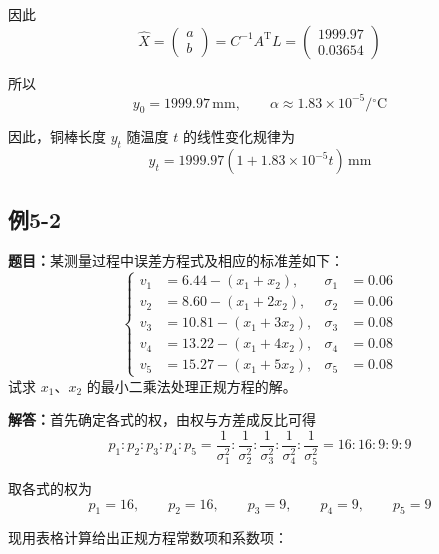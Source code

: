 \documentclass[UTF8,zihao=-4]{ctexart}
\newcommand{\problem}[1]{\subsection*{#1}}
\newcommand{\timu}{\noindent\textbf{题目：}}
\newcommand{\jieda}{\noindent\textbf{解答：}}
\begin{document}
因此
\begin{equation*}
    \hat{X}
    =
    \begin{pmatrix}
        a\\
        b
    \end{pmatrix}
    =
    C^{-1}A^{\mathrm{T}}L
    =
    \begin{pmatrix}
        1999.97\\
        0.03654
    \end{pmatrix}
\end{equation*}

所以
\begin{equation*}
    y_0=1999.97\,\mathrm{mm},
    \qquad
    \alpha\approx1.83\times10^{-5}/{}^\circ\mathrm{C}
\end{equation*}

因此，铜棒长度 $y_t$ 随温度 $t$ 的线性变化规律为
\begin{equation*}
    y_t=1999.97\left(1+1.83\times10^{-5}t\right)\,\mathrm{mm}
\end{equation*}

\problem{例5-2}

\timu 某测量过程中误差方程式及相应的标准差如下：
\begin{equation*}
\left\{
\begin{aligned}
    v_1&=6.44-(x_1+x_2),        & \sigma_1&=0.06\\
    v_2&=8.60-(x_1+2x_2),       & \sigma_2&=0.06\\
    v_3&=10.81-(x_1+3x_2),      & \sigma_3&=0.08\\
    v_4&=13.22-(x_1+4x_2),      & \sigma_4&=0.08\\
    v_5&=15.27-(x_1+5x_2),      & \sigma_5&=0.08
\end{aligned}
\right.
\end{equation*}
试求 $x_1$、$x_2$ 的最小二乘法处理正规方程的解。

\jieda 首先确定各式的权，由权与方差成反比可得
\begin{equation*}
    p_1:p_2:p_3:p_4:p_5
    =
    \frac{1}{\sigma_1^2}:
    \frac{1}{\sigma_2^2}:
    \frac{1}{\sigma_3^2}:
    \frac{1}{\sigma_4^2}:
    \frac{1}{\sigma_5^2}
    =
    16:16:9:9:9
\end{equation*}

取各式的权为
\begin{equation*}
    p_1=16,\qquad p_2=16,\qquad p_3=9,\qquad p_4=9,\qquad p_5=9
\end{equation*}

现用表格计算给出正规方程常数项和系数项：
\end{document}
